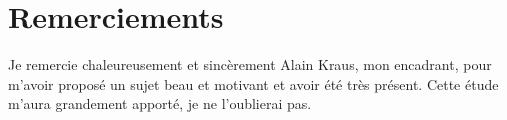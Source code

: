 \section*{Remerciements}

Je remercie chaleureusement et sincèrement Alain Kraus, mon encadrant, pour m'avoir proposé un sujet beau et motivant et avoir été très présent. Cette étude m'aura grandement apporté, je ne l'oublierai pas.
